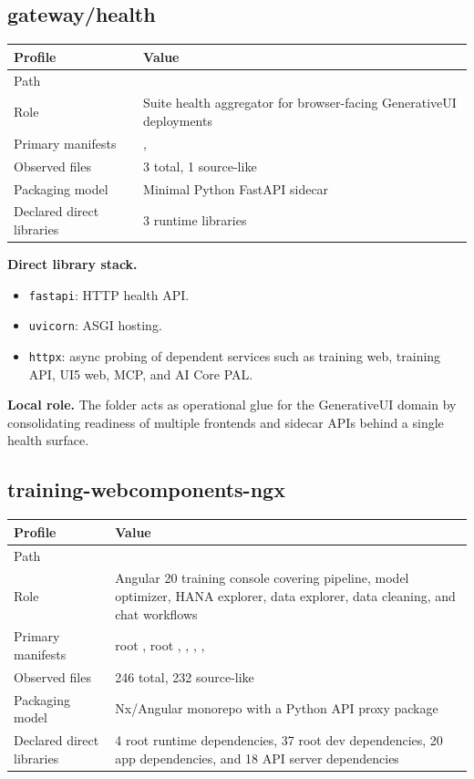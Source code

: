 \documentclass[11pt,a4paper]{article}
\begin{document}
\subsection{gateway/health}

\begin{tabular}{@{}P{4.2cm}P{9.8cm}@{}}
\toprule
\textbf{Profile} & \textbf{Value} \\
\midrule
Path &  \\
Role & Suite health aggregator for browser-facing GenerativeUI deployments \\
Primary manifests & ,  \\
Observed files & 3 total, 1 source-like \\
Packaging model & Minimal Python FastAPI sidecar \\
Declared direct libraries & 3 runtime libraries \\
\bottomrule
\end{tabular}

\textbf{Direct library stack.}
\begin{itemize}[leftmargin=*]
    \item \texttt{fastapi}: HTTP health API.
    \item \texttt{uvicorn}: ASGI hosting.
    \item \texttt{httpx}: async probing of dependent services such as training web, training API, UI5 web, MCP, and AI Core PAL.
\end{itemize}

\textbf{Local role.} The folder acts as operational glue for the GenerativeUI domain by consolidating readiness of multiple frontends and sidecar APIs behind a single health surface.

\subsection{training-webcomponents-ngx}

\begin{tabular}{@{}P{4.2cm}P{9.8cm}@{}}
\toprule
\textbf{Profile} & \textbf{Value} \\
\midrule
Path &  \\
Role & Angular 20 training console covering pipeline, model optimizer, HANA explorer, data explorer, data cleaning, and chat workflows \\
Primary manifests & root , root , , , ,  \\
Observed files & 246 total, 232 source-like \\
Packaging model & Nx/Angular monorepo with a Python API proxy package \\
Declared direct libraries & 4 root runtime dependencies, 37 root dev dependencies, 20 app dependencies, and 18 API server dependencies \\
\bottomrule
\end{tabular}
\end{document}
